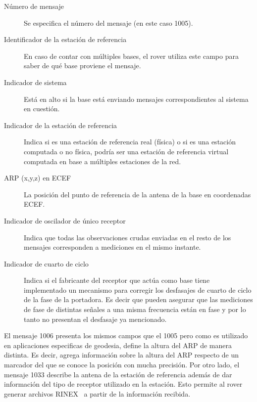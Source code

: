 \documentclass[a4paper,12pt,oneside,onecolumn,final,openright]{book}%
\begin{document}

\begin{description}
	\item[Número de mensaje] Se especifica el número del mensaje (en este caso 1005).
	\item[Identificador de la estación de referencia] En caso de contar con múltiples bases, el rover utiliza este campo para saber de qué base proviene el mensaje.
	\item[Indicador de sistema] Está en alto si la base está enviando mensajes correspondientes al sistema en cuestión.
	\item[Indicador de la estación de referencia] Indica si es una estación de referencia real (física) o si es una estación computada o no física, podría ser una estación de referencia virtual computada en base a múltiples estaciones de la red.
	\item[ARP (x,y,z) en ECEF] La posición del punto de referencia de la antena de la base en coordenadas ECEF.
	\item [Indicador de oscilador de único receptor] Indica que todas las observaciones crudas enviadas en el resto de los mensajes corresponden a mediciones en el mismo instante.
	\item[Indicador de cuarto de ciclo] Indica si el fabricante del receptor que actúa como base tiene implementado un mecanismo para corregir los desfasajes de cuarto de ciclo de la fase de la portadora. Es decir que pueden asegurar que las mediciones de fase de distintas señales a una misma frecuencia están en fase y por lo tanto no presentan el desfasaje ya mencionado.
\end{description}
	
	El mensaje 1006 presenta los mismos campos que el 1005 pero como es utilizado en aplicaciones especificas de geodesia, define la altura del ARP de manera distinta. Es decir, agrega información sobre la altura del ARP respecto de un marcador del que se conoce la posición con mucha precisión. Por otro lado, el mensaje 1033 describe la antena de la estación de referencia además de dar información del tipo de receptor utilizado en la estación. Esto permite al rover generar archivos RINEX~\cite{rinex} a partir de la información recibida.
	
\end{document}
